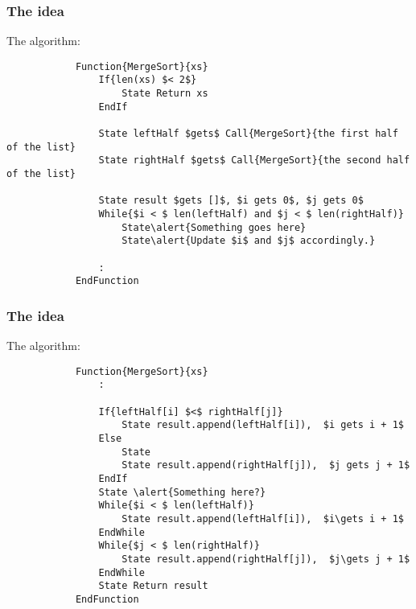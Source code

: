 \begin{frame}[fragile]
	\frametitle{The idea}

			The algorithm:
		\begin{lstlisting}
			Function{MergeSort}{xs}
				If{len(xs) $< 2$}	
					State Return xs
				EndIf
			
				State leftHalf $gets$ Call{MergeSort}{the first half of the list}
				State rightHalf $gets$ Call{MergeSort}{the second half of the list}
			
				State result $gets []$, $i gets 0$, $j gets 0$
				While{$i < $ len(leftHalf) and $j < $ len(rightHalf)}
					State\alert{Something goes here}
					State\alert{Update $i$ and $j$ accordingly.}

				:
			EndFunction
		\end{lstlisting}
		

\end{frame}

\begin{frame}[fragile]
	\frametitle{The idea}

			The algorithm:
		\begin{lstlisting}
			Function{MergeSort}{xs}
				:

				If{leftHalf[i] $<$ rightHalf[j]}
					State result.append(leftHalf[i]),  $i gets i + 1$
				Else
					State 
					State result.append(rightHalf[j]),  $j gets j + 1$
				EndIf
				State \alert{Something here?}
				While{$i < $ len(leftHalf)}
					State result.append(leftHalf[i]),  $i\gets i + 1$
				EndWhile
				While{$j < $ len(rightHalf)}
					State result.append(rightHalf[j]),  $j\gets j + 1$
				EndWhile
				State Return result
			EndFunction
		\end{lstlisting}
		
\end{frame}

